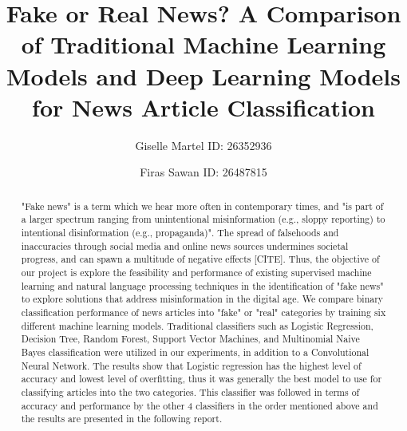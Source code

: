 \documentclass[10pt,twocolumn,letterpaper]{article}
\begin{document}
\title{Fake or Real News? A Comparison of Traditional Machine Learning Models and Deep Learning Models for News Article Classification}
\author{Giselle Martel ID: 26352936 \and Firas Sawan ID: 26487815}
\maketitle

\begin{abstract}
   "Fake news" is a term which we hear more often in contemporary times, and "is part of a larger spectrum ranging from unintentional misinformation (e.g., sloppy reporting) to intentional disinformation (e.g., propaganda)"\cite{doi:https://doi.org/10.1002/9781118841570.iejs0128}. The spread of falsehoods and inaccuracies through social media and online news sources undermines societal progress, and can spawn a multitude of negative effects [CITE]. Thus, the objective of our project is explore the feasibility and performance of existing supervised machine learning and natural language processing techniques in the identification of "fake news" to explore solutions that address misinformation in the digital age. We compare binary classification performance of news articles into "fake" or "real" categories by training six different machine learning models. Traditional classifiers such as Logistic Regression, Decision Tree, Random Forest, Support Vector Machines, and Multinomial Naive Bayes classification were utilized in our experiments, in addition to a Convolutional Neural Network. The results show that Logistic regression has the highest level of accuracy and lowest level of overfitting, thus it was generally the best model to use for classifying articles into the two categories. This classifier was followed in terms of accuracy and performance by the other 4 classifiers in the order mentioned above and the results are presented in the following report. 
\end{abstract} 

\end{document}
